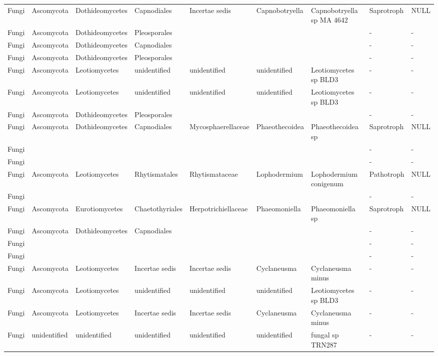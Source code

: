 \documentclass[12pt]{article}\usepackage[]{graphicx}\usepackage[]{color}
\numberwithin{figure}{section}
\begin{document}
\begin{landscape}
\begin{table}[ht]
\begin{tabular}{lllllllll}
  Fungi & Ascomycota & Dothideomycetes & Capnodiales & Incertae sedis & Capnobotryella & Capnobotryella sp MA 4642 & Saprotroph & NULL \\ 
  Fungi & Ascomycota & Dothideomycetes & Pleosporales &  &  &  & - & - \\ 
  Fungi & Ascomycota & Dothideomycetes & Capnodiales &  &  &  & - & - \\ 
  Fungi & Ascomycota & Dothideomycetes & Pleosporales &  &  &  & - & - \\ 
  Fungi & Ascomycota & Leotiomycetes & unidentified & unidentified & unidentified & Leotiomycetes sp BLD3 & - & - \\ 
  Fungi & Ascomycota & Leotiomycetes & unidentified & unidentified & unidentified & Leotiomycetes sp BLD3 & - & - \\ 
  Fungi & Ascomycota & Dothideomycetes & Pleosporales &  &  &  & - & - \\ 
  Fungi & Ascomycota & Dothideomycetes & Capnodiales & Mycosphaerellaceae & Phaeothecoidea & Phaeothecoidea sp & Saprotroph & NULL \\ 
  Fungi &  &  &  &  &  &  & - & - \\ 
  Fungi &  &  &  &  &  &  & - & - \\ 
  Fungi & Ascomycota & Leotiomycetes & Rhytismatales & Rhytismataceae & Lophodermium & Lophodermium conigenum & Pathotroph & NULL \\ 
  Fungi &  &  &  &  &  &  & - & - \\ 
  Fungi & Ascomycota & Eurotiomycetes & Chaetothyriales & Herpotrichiellaceae & Phaeomoniella & Phaeomoniella sp & Saprotroph & NULL \\ 
  Fungi & Ascomycota & Dothideomycetes & Capnodiales &  &  &  & - & - \\ 
  Fungi &  &  &  &  &  &  & - & - \\ 
  Fungi &  &  &  &  &  &  & - & - \\ 
  Fungi & Ascomycota & Leotiomycetes & Incertae sedis & Incertae sedis & Cyclaneusma & Cyclaneusma minus & - & - \\ 
  Fungi & Ascomycota & Leotiomycetes & unidentified & unidentified & unidentified & Leotiomycetes sp BLD3 & - & - \\ 
  Fungi & Ascomycota & Leotiomycetes & Incertae sedis & Incertae sedis & Cyclaneusma & Cyclaneusma minus & - & - \\ 
  Fungi & unidentified & unidentified & unidentified & unidentified & unidentified & fungal sp TRN287 & - & - \\ 

\end{tabular}
\end{table}
\end{landscape}
\end{document}
